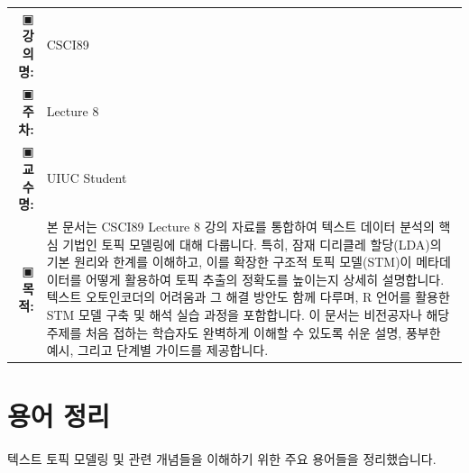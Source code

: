 \documentclass[11pt,a4paper]{article}
\makeatletter
\theoremstyle{definition}
\newcommand{\metainfo}[4]{
\begin{tcolorbox}[
    colback=lightpurple,
    colframe=darkpurple,
    boxrule=1pt,
    arc=2mm,
    left=10pt,
    right=10pt,
    top=8pt,
    bottom=8pt
]
\begin{tabular}{@{}rl@{}}
▣ \textbf{강의명:} & #1 \\[0.3em]
▣ \textbf{주차:} & #2 \\[0.3em]
▣ \textbf{교수명:} & #3 \\[0.3em]
▣ \textbf{목적:} & \begin{minipage}[t]{0.75\textwidth}#4\end{minipage}
\end{tabular}
\end{tcolorbox}
}
\makeatother
\begin{document}
\thispagestyle{firstpage}

\metainfo{CSCI89}{Lecture 8}{UIUC Student}{본 문서는 CSCI89 Lecture 8 강의 자료를 통합하여 텍스트 데이터 분석의 핵심 기법인 토픽 모델링에 대해 다룹니다. 특히, 잠재 디리클레 할당(LDA)의 기본 원리와 한계를 이해하고, 이를 확장한 구조적 토픽 모델(STM)이 메타데이터를 어떻게 활용하여 토픽 추출의 정확도를 높이는지 상세히 설명합니다. 텍스트 오토인코더의 어려움과 그 해결 방안도 함께 다루며, R 언어를 활용한 STM 모델 구축 및 해석 실습 과정을 포함합니다. 이 문서는 비전공자나 해당 주제를 처음 접하는 학습자도 완벽하게 이해할 수 있도록 쉬운 설명, 풍부한 예시, 그리고 단계별 가이드를 제공합니다.}

\tableofcontents

\newpage

\section{용어 정리}
텍스트 토픽 모델링 및 관련 개념들을 이해하기 위한 주요 용어들을 정리했습니다.
\end{document}
